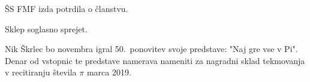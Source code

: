 \documentclass{seja}
\begin{document}
\begin{ad}
	\item
	\begin{sklep}
		ŠS FMF izda potrdila o članstvu.
	\end{sklep}
	Sklep soglasno sprejet.
	
	\item Nik Škrlec bo novembra igral 50.~ponovitev svoje predstave: "Naj gre vse v Pi". Denar od vstopnic te predstave namerava nameniti za nagradni sklad tekmovanja v recitiranju števila $\pi$ marca 2019.
	
\end{ad}

\makeatletter \global\let\@enddocumenthook\@empty \makeatother
{}
\end{document}
